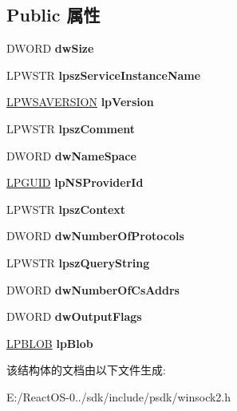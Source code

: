 \subsection*{Public 属性}
\begin{DoxyCompactItemize}
\item 
\mbox{\label{struct___w_s_a_query_set2_w_af3b55ac956ac1cc0a66f3cba69a3598f}} 
D\+W\+O\+RD {\bfseries dw\+Size}
\item 
\mbox{\label{struct___w_s_a_query_set2_w_a7e6a650ca1cb70247c38545869ffa1bf}} 
L\+P\+W\+S\+TR {\bfseries lpsz\+Service\+Instance\+Name}
\item 
\mbox{\label{struct___w_s_a_query_set2_w_a62886ebc391ce1806d25242e963c7b1d}} 
\hyperlink{struct___w_s_a_version}{L\+P\+W\+S\+A\+V\+E\+R\+S\+I\+ON} {\bfseries lp\+Version}
\item 
\mbox{\label{struct___w_s_a_query_set2_w_ad1b721d905a32ba63c8ad5991f98e553}} 
L\+P\+W\+S\+TR {\bfseries lpsz\+Comment}
\item 
\mbox{\label{struct___w_s_a_query_set2_w_a8a76449d246a2d41bdfda01c08b786a7}} 
D\+W\+O\+RD {\bfseries dw\+Name\+Space}
\item 
\mbox{\label{struct___w_s_a_query_set2_w_adbd3e76782a6d586b27885b0a2991b5d}} 
\hyperlink{interface_g_u_i_d}{L\+P\+G\+U\+ID} {\bfseries lp\+N\+S\+Provider\+Id}
\item 
\mbox{\label{struct___w_s_a_query_set2_w_a61386125461865af430d1fc0203707cc}} 
L\+P\+W\+S\+TR {\bfseries lpsz\+Context}
\item 
\mbox{\label{struct___w_s_a_query_set2_w_aa10f0a4ec02768ca0bebf2e62b678ed7}} 
D\+W\+O\+RD {\bfseries dw\+Number\+Of\+Protocols}
\item 
\mbox{\label{struct___w_s_a_query_set2_w_a7220eff3f1439ae2313ff3fb14fe8126}} 
L\+P\+W\+S\+TR {\bfseries lpsz\+Query\+String}
\item 
\mbox{\label{struct___w_s_a_query_set2_w_abddec0958c0464343f26b2c3382b9c20}} 
D\+W\+O\+RD {\bfseries dw\+Number\+Of\+Cs\+Addrs}
\item 
\mbox{\label{struct___w_s_a_query_set2_w_aab6661f2e6b8b54b1f1a54ba3246e09f}} 
D\+W\+O\+RD {\bfseries dw\+Output\+Flags}
\item 
\mbox{\label{struct___w_s_a_query_set2_w_a671c2c8ca4756a1d8af41e4b3e4589f1}} 
\hyperlink{struct___b_l_o_b}{L\+P\+B\+L\+OB} {\bfseries lp\+Blob}
\end{DoxyCompactItemize}


该结构体的文档由以下文件生成\+:\begin{DoxyCompactItemize}
\item 
E\+:/\+React\+O\+S-\/0../sdk/include/psdk/winsock2.\+h\end{DoxyCompactItemize}
